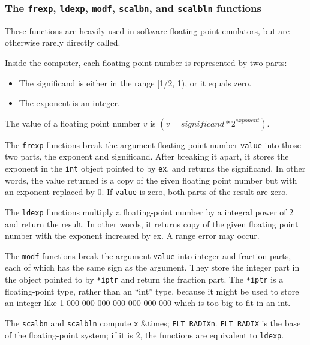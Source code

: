 \subsubsection{The \texttt{frexp}, \texttt{ldexp}, \texttt{modf}, \texttt{scalbn}, and \texttt{scalbln} functions}
These functions are heavily used in software floating-point emulators, but are
otherwise rarely directly called.

Inside the computer, each floating point number is represented by two parts:
\begin{itemize}
	\item The significand is either in the range [1/2, 1), or it equals zero.
	\item The exponent is an integer.
\end{itemize}

The value of a floating point number \(v\) is
$(v = significand * 2^{exponent})$.

The \texttt{frexp} functions break the argument floating point number
\texttt{value} into those two parts, the exponent and significand.  After
breaking it apart, it stores the exponent in the \texttt{int} object pointed to
by \texttt{ex}, and returns the significand.  In other words, the value
returned is a copy of the given floating point number but with an exponent
replaced by 0.  If \texttt{value} is zero, both parts of the result are zero.

The \texttt{ldexp} functions multiply a floating-point number by a integral
power of 2 and return the result.  In other words, it returns copy of the given
floating point number with the exponent increased by ex.  A range error may
occur.

The \texttt{modf} functions break the argument \texttt{value} into integer and
fraction parts, each of which has the same sign as the argument. They store the
integer part in the object pointed to by \texttt{*iptr} and return the fraction
part.  The \texttt{*iptr} is a floating-point type, rather than an ``int''
type, because it might be used to store an integer like 1 000 000 000 000 000
000 000 which is too big to fit in an int.

The \texttt{scalbn} and \texttt{scalbln} compute \texttt{x} \&times;
\texttt{FLT\_RADIX\texttt{n}}.
\texttt{FLT\_RADIX} is the base of the floating-point system; if it is 2, the
functions are equivalent to \texttt{ldexp}.


